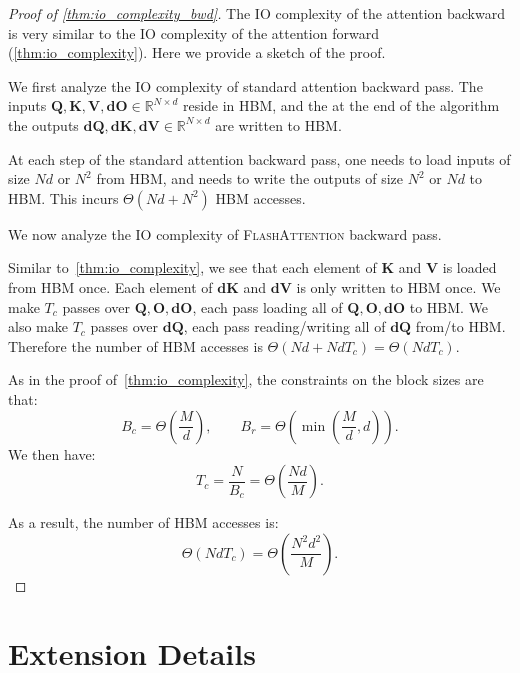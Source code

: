 \documentclass{article}
\newcommand{\vQ}{\mathbf{Q}}
\newcommand{\vK}{\mathbf{K}}
\newcommand{\vV}{\mathbf{V}}
\newcommand{\vdQ}{\mathbf{dQ}}
\newcommand{\vdK}{\mathbf{dK}}
\newcommand{\vdV}{\mathbf{dV}}
\newcommand{\vO}{\mathbf{O}}
\newcommand{\vdO}{\mathbf{dO}}
\newcommand{\sysname}{\textsc{FlashAttention}\xspace}
\begin{document}
\begin{proof}[Proof of \cref{thm:io_complexity_bwd}]
  The IO complexity of the attention backward is very similar to the IO
  complexity of the attention forward (\cref{thm:io_complexity}).
  Here we provide a sketch of the proof.

  We first analyze the IO complexity of standard attention backward pass.
  The inputs $\vQ, \vK, \vV, \vdO \in \mathbb{R}^{N \times d}$ reside in HBM, and
  the at the end of the algorithm the outputs $\vdQ, \vdK, \vdV \in \mathbb{R}^{N \times d}$ are
  written to HBM.

  At each step of the standard attention backward pass, one needs to load inputs
  of size $Nd$ or $N^2$ from HBM, and needs to write the outputs of size $N^2$
  or $Nd$ to HBM.
  This incurs $\Theta(Nd + N^2)$ HBM accesses.

  We now analyze the IO complexity of \sysname backward pass.

  Similar to~\cref{thm:io_complexity}, we see that each element of $\vK$ and
  $\vV$ is loaded from HBM once.
  Each element of $\vdK$ and $\vdV$ is only written to HBM once.
  We make $T_c$ passes over $\vQ, \vO, \vdO$, each pass loading all of
  $\vQ, \vO, \vdO$ to HBM.
  We also make $T_c$ passes over $\vdQ$, each pass reading/writing all of $\vdQ$
  from/to HBM.
  Therefore the number of HBM accesses is
  $\Theta \left( Nd + Nd T_c \right) = \Theta(Nd T_c)$.

  As in the proof of~\cref{thm:io_complexity}, the constraints on the block
  sizes are that:
  \begin{equation*}
    B_c = \Theta \left( \frac{M}{d} \right), \qquad
    B_r = \Theta \left( \min \left( \frac{M}{d}, d \right) \right).
  \end{equation*}
  We then have:
  \begin{equation*}
    T_c = \frac{N}{B_c} = \Theta \left( \frac{Nd}{M} \right).
  \end{equation*}

  As a result, the number of HBM accesses is:
  \begin{equation*}
    \Theta \left( Nd T_c \right) = \Theta \left( \frac{N^2 d^2}{M} \right).
  \end{equation*}

\end{proof}

\section{Extension Details}
\label{sec:extension_details}
\end{document}
